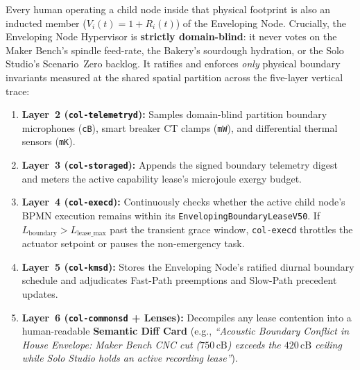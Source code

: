 Every human operating a child node inside that physical footprint is also an inducted member
($V_i(t) = 1 + R_i(t)$) of the Enveloping Node. Crucially, the Enveloping Node Hypervisor is
\textbf{strictly domain-blind}: it never votes on the Maker Bench's spindle feed-rate, the Bakery's
sourdough hydration, or the Solo Studio's Scenario~Zero backlog. It ratifies and enforces
\textit{only} physical boundary invariants measured at the shared spatial partition across the
five-layer vertical trace:
\begin{enumerate}
\item \textbf{Layer~2 (\texttt{col-telemetryd}):} Samples domain-blind partition boundary
        microphones (\texttt{cB}), smart breaker CT clamps (\texttt{mW}), and differential thermal
        sensors (\texttt{mK}).
\item \textbf{Layer~3 (\texttt{col-storaged}):} Appends the signed boundary telemetry digest and
        meters the active capability lease's microjoule exergy budget.
\item \textbf{Layer~4 (\texttt{col-execd}):} Continuously checks whether the active child node's
        BPMN execution remains within its \texttt{EnvelopingBoundaryLeaseV50}. If
        $L_{\mathrm{boundary}} > L_{\mathrm{lease\_max}}$ past the transient grace window,
        \texttt{col-execd} throttles the actuator setpoint or pauses the non-emergency task.
\item \textbf{Layer~5 (\texttt{col-kmsd}):} Stores the Enveloping Node's ratified diurnal boundary
        schedule and adjudicates Fast-Path preemptions and Slow-Path precedent updates.
\item \textbf{Layer~6 (\texttt{col-commonsd} + Lenses):} Decompiles any lease contention into a
        human-readable \textbf{Semantic Diff Card} (e.g., \textit{``Acoustic Boundary Conflict in
        House Envelope: Maker Bench CNC cut ($750\,\mathrm{cB}$) exceeds the $420\,\mathrm{cB}$
        ceiling while Solo Studio holds an active recording lease''}).
\end{enumerate}


